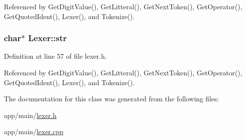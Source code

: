 Referenced by Get\+Digit\+Value(), Get\+Litteral(), Get\+Next\+Token(), Get\+Operator(), Get\+Quoted\+Ident(), Lexer(), and Tokenize().

\subsubsection[{\texorpdfstring{str}{str}}]{\setlength{\rightskip}{0pt plus 5cm}char$\ast$ Lexer\+::str\hspace{0.3cm}{\ttfamily [private]}}\hypertarget{classLexer_ab2ebe8e8906184cb2e58ec6779c5f9e7}{}\label{classLexer_ab2ebe8e8906184cb2e58ec6779c5f9e7}


Definition at line 57 of file lexer.\+h.



Referenced by Get\+Digit\+Value(), Get\+Litteral(), Get\+Next\+Token(), Get\+Operator(), Get\+Quoted\+Ident(), Lexer(), and Tokenize().



The documentation for this class was generated from the following files\+:\begin{DoxyCompactItemize}
\item 
app/main/\hyperlink{lexer_8h}{lexer.\+h}\item 
app/main/\hyperlink{lexer_8cpp}{lexer.\+cpp}\end{DoxyCompactItemize}
